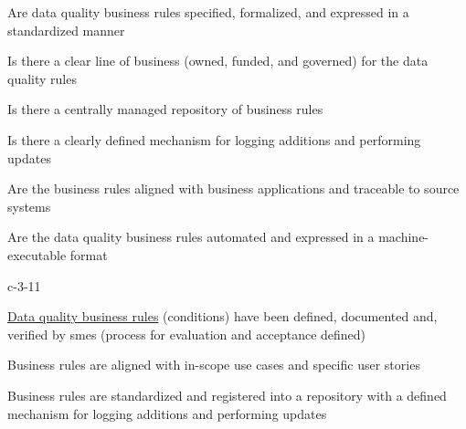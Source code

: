%
%



\begin{maturity-dimensions}

  \item Are data quality business rules specified, formalized, and expressed in a standardized manner
  \item Is there a clear line of business  (owned, funded, and governed) for the
        data quality rules
  \item Is there a centrally managed repository of business rules
  \item Is there a clearly defined mechanism for logging additions and performing updates
  \item Are the business rules aligned with business applications and traceable to source systems
  \item Are the data quality business rules automated and expressed in a machine-executable format

\end{maturity-dimensions}

\ekgmmCapabilitySectionLevelsOneFive

\begin{level-assessment}{c-3-1}{1}

  \item \hyperref[sec:ekg-mm-data-quality-business-rules]{Data quality business rules} (conditions) have been defined,
        documented and, verified by \glspl{sme} (process for evaluation and acceptance defined)
  \item Business rules are aligned with in-scope use cases and specific user stories
  \item Business rules are standardized and registered into a repository with a defined mechanism for logging
        additions and performing updates

\end{level-assessment}

